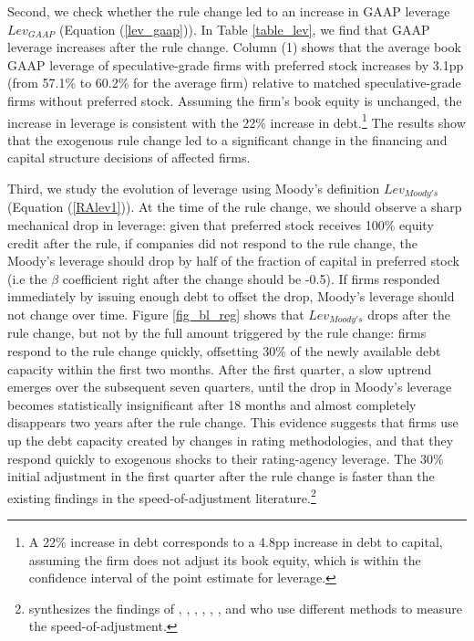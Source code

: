 \documentclass[a4paper, 12pt]{article}
\begin{document}
Second, we check whether the rule change led to an increase in GAAP leverage $Lev_{GAAP}$ (Equation (\ref{lev_gaap})). In Table \ref{table_lev}, we find that GAAP leverage increases after the rule change. Column (1) shows that the average book GAAP leverage of speculative-grade firms with preferred stock increases by 3.1pp (from 57.1\% to 60.2\% for the average firm) relative to matched speculative-grade firms without preferred stock. Assuming the firm's book equity is unchanged, the increase in leverage is consistent with the 22\% increase in debt.\footnote{A 22\% increase in debt corresponds to a 4.8pp increase in debt to capital, assuming the firm does not adjust its book equity, which is within the confidence interval of the point estimate for leverage.} The results show that the exogenous rule change led to a significant change in the financing and capital structure decisions of affected firms.


Third, we study the evolution of leverage using Moody's definition $Lev_{Moody's}$ (Equation (\ref{RAlev1})). At the time of the rule change, we should observe a sharp mechanical drop in leverage: given that preferred stock receives 100\% equity credit after the rule, if companies did not respond to the rule change, the Moody's leverage should drop by half of the fraction of capital in preferred stock (i.e the $\beta$ coefficient right after the change should be -0.5). If firms responded immediately by issuing enough debt to offset the drop, Moody's leverage should not change over time. Figure \ref{fig_bl_reg} shows that $Lev_{Moody's}$ drops after the rule change, but not by the full amount triggered by the rule change: firms respond to the rule change quickly, offsetting 30\% of the newly available debt capacity within the first two months. After the first quarter, a slow uptrend emerges over the subsequent seven quarters, until the drop in Moody's leverage becomes statistically insignificant after 18 months and almost completely disappears two years after the rule change. This evidence suggests that firms use up the debt capacity created by changes in rating methodologies, and that they respond quickly to exogenous shocks to their rating-agency leverage. The $30\%$ initial adjustment in the first quarter after the rule change is faster than the existing findings in the speed-of-adjustment literature.\footnote{\cite{graham2011review} synthesizes the findings of \cite{fama2002testing}, \cite{kayhan2007firms}, \cite{flannery2006partial}, \cite{lemmon2008back}, \cite{huang2009testing}, \cite{elsas2015dynamic}, and \cite{iliev2010reconciling} who use different methods to measure the speed-of-adjustment.}
\end{document}
